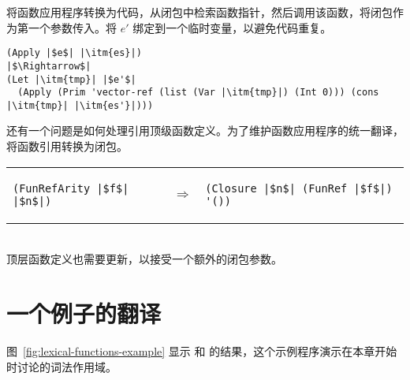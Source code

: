 \documentclass[11pt]{book}
\begin{document}
将函数应用程序转换为代码，从闭包中检索函数指针，然后调用该函数，将闭包作为第一个参数传入。将 $e'$ 绑定到一个临时变量，以避免代码重复。
\begin{lstlisting}
(Apply |$e$| |\itm{es}|)
|$\Rightarrow$|
(Let |\itm{tmp}| |$e'$|
  (Apply (Prim 'vector-ref (list (Var |\itm{tmp}|) (Int 0))) (cons |\itm{tmp}| |\itm{es'}|)))
\end{lstlisting}

还有一个问题是如何处理引用顶级函数定义。为了维护函数应用程序的统一翻译，将函数引用转换为闭包。

\begin{tabular}{lll}
\begin{minipage}{0.3\textwidth}
\begin{lstlisting}
(FunRefArity |$f$| |$n$|)
\end{lstlisting}
\end{minipage}
&
$\Rightarrow$
&
\begin{minipage}{0.5\textwidth}
\begin{lstlisting}
(Closure |$n$| (FunRef |$f$|) '())
\end{lstlisting}
\end{minipage}
\end{tabular}  \\
%
顶层函数定义也需要更新，以接受一个额外的闭包参数。

\section{一个例子的翻译}
\label{sec:example-lambda}

图~\ref{fig:lexical-functions-example} 显示
 和  的结果，这个示例程序演示在本章开始时讨论的词法作用域。
\end{document}
